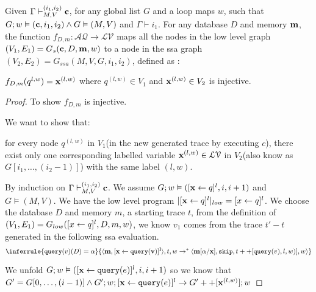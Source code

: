 \documentclass[a4paper,11pt]{article}
\begin{document}
\begin{lem}\label{lem:vertex}
Given $ \Gamma \vdash_{M,V}^{(i_1,i_2)} \mathbf{{c}}$, for any global list $G$ and a loop maps $w$, such that $G ;w \vDash (\mathbf{{c}}, i_1, i_2) \land G \vDash (M,V)$ and $\Gamma \vdash i_1$. For any database $D$ and memory $\mathbf{{m}}$, the function $f_{D,m}: \mathcal{AQ} \to \mathcal{LV}$ maps all the nodes in the low level graph $(V_1, E_1) = G_{s}(\mathbf{{c}}, D, \mathbf{{m}},w)$ to a node in the ssa graph $(V_2,E_2) = G_{ssa}(M,V,G,i_1,i_2)$, defined as :

$f_{D,m}(q^{l,w}) = \mathbf{{x}}^{(l,w)}$ where $q^{(l,w)} \in V_1 $ and $\mathbf{{x}}^{(l,w)} \in V_2$ is injective.
\end{lem}
%
\begin{proof}
 To show $f_{D,m}$ is injective.
 
 We want to show that:
 
 for every node $q^{(l,w)}$ in $V_1$(in the new generated trace by executing $c$), there exist only one corresponding labelled variable $\mathbf{{x}}^{(l,w)} \in \mathcal{LV}$ in $V_2$(also know as $G[i_1,\ldots, (i_2-1)]$) with the same label $(l, w)$. 

By induction on $ \Gamma \vdash_{M,V}^{(i_1,i_2)} \mathbf{{c}}$.
  We assume $G;w \vDash ( [ \mathrel{ \mathbf{{x}} \leftarrow q }]^{l} , i, i+1 )$ and $G \vDash (M,V)$. We have the low level program $|[ \mathrel{ \mathbf{{x}} \leftarrow q }]^{l} |_{low} = [\mathrel{ x \leftarrow q }]^{l}$. We choose the database $D$ and memory $m$, a starting trace $t$, 
  from the definition of $(V_1,E_1)= G_{low}( [\mathrel{ x \leftarrow q }]^{l} , D,m,w)$, we know $v_1$ comes from the trace $t' -t$ generated in the following ssa evaluation.
   \[ 
    \inferrule{
     \query(v)(D) = \qval
    }{
   \config{\ssa{m, [\assign{x}{\query(v)}]^{l}}}, t, w  \to^{*} \config{\ssa{m[\qval/x]},\eskip, t++[\query(v),l,w)], w} } \]
 
   We unfold $G; w \vDash ( [\mathrel{ \mathbf{{x}} \leftarrow {\tt query}(e) }]^{l}, i, i+1) $ so we know that 
   $G' = G[0, \ldots, (i-1)] \land G';w; [\mathrel{ \mathbf{{x}} \leftarrow {\tt query}(e) }]^{l} \to G' ++ [\mathbf{{x}}^{(l,w)}]; w$
  

\end{proof}
\end{document}
